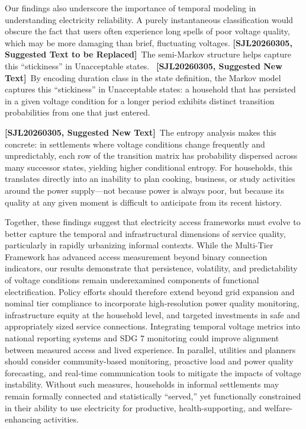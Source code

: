 \documentclass[review]{elsarticle}
\DeclareRobustCommand{\suggestreplacesjl}[2]{%
  {\color{sjlmutedred}\textbf{[SJL20260305, Suggested Text to be Replaced]}\ #1}%
  \ {\color{sjlmutedblue}\textbf{[SJL20260305, Suggested New Text]}\ #2}%
}
\begin{document}
Our findings also underscore the importance of temporal modeling in understanding electricity reliability. A purely instantaneous classification would obscure the fact that users often experience long spells of poor voltage quality, which may be more damaging than brief, fluctuating voltages. \suggestreplacesjl{The semi-Markov structure helps capture this “stickiness” in Unacceptable states.}{By encoding duration class in the state definition, the Markov model captures this ``stickiness'' in Unacceptable states: a household that has persisted in a given voltage condition for a longer period exhibits distinct transition probabilities from one that just entered.}

{\color{sjlmutedblue}\textbf{[SJL20260305, Suggested New Text]}\ The entropy analysis makes this concrete: in settlements where voltage conditions change frequently and unpredictably, each row of the transition matrix has probability dispersed across many successor states, yielding higher conditional entropy. For households, this translates directly into an inability to plan cooking, business, or study activities around the power supply---not because power is always poor, but because its quality at any given moment is difficult to anticipate from its recent history.}

Together, these findings suggest that electricity access frameworks must evolve to better capture the temporal and infrastructural dimensions of service quality, particularly in rapidly urbanizing informal contexts. While the Multi-Tier Framework has advanced access measurement beyond binary connection indicators, our results demonstrate that persistence, volatility, and predictability of voltage conditions remain underexamined components of functional electrification. Policy efforts should therefore extend beyond grid expansion and nominal tier compliance to incorporate high-resolution power quality monitoring, infrastructure equity at the household level, and targeted investments in safe and appropriately sized service connections. Integrating temporal voltage metrics into national reporting systems and SDG 7 monitoring could improve alignment between measured access and lived experience. In parallel, utilities and planners should consider community-based monitoring, proactive load and power quality forecasting, and real-time communication tools to mitigate the impacts of voltage instability. Without such measures, households in informal settlements may remain formally connected and statistically “served,” yet functionally constrained in their ability to use electricity for productive, health-supporting, and welfare-enhancing activities.
\end{document}
